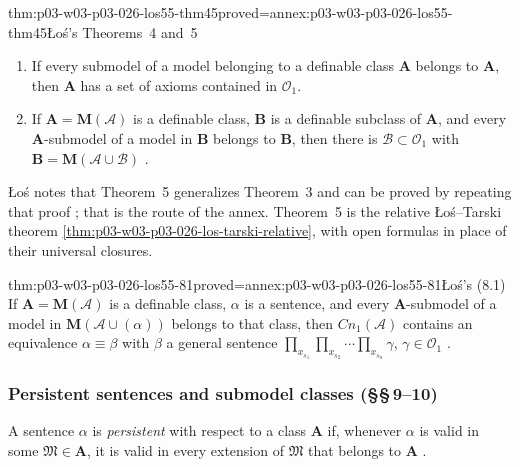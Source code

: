 \begin{hbtheorem}{thm:p03-w03-p03-026-los55-thm45}{proved=annex:p03-w03-p03-026-los55-thm45}{\L o\'s's Theorems~4 and~5}
\begin{enumerate}
 \item[(Theorem~4)] If every submodel of a model belonging to a definable
       class \(\mathbf A\) belongs to \(\mathbf A\), then \(\mathbf A\) has a
       set of axioms contained in \(\mathcal O_1\).
 \item[(Theorem~5)] If \(\mathbf A=\mathbf M(\mathcal A)\) is a definable
       class, \(\mathbf B\) is a definable subclass of \(\mathbf A\), and
       every \(\mathbf A\)-submodel of a model in \(\mathbf B\) belongs to
       \(\mathbf B\), then there is \(\mathcal B\subset\mathcal O_1\) with
       \(\mathbf B=\mathbf M(\mathcal A\cup\mathcal B)\)
       \cite[p.~47]{Los1955}.
\end{enumerate}
\end{hbtheorem}

\L o\'s notes that Theorem~5 generalizes Theorem~3 and can be proved by
repeating that proof \cite[p.~47]{Los1955}; that is the route of the annex.
Theorem~5 is the relative \L o\'s--Tarski theorem
\cref{thm:p03-w03-p03-026-los-tarski-relative}, with open formulas in place
of their universal closures.

\begin{hbcorollary}{thm:p03-w03-p03-026-los55-81}{proved=annex:p03-w03-p03-026-los55-81}{\L o\'s's (8.1)}
If \(\mathbf A=\mathbf M(\mathcal A)\) is a definable class, \(\alpha\) is a
sentence, and every \(\mathbf A\)-submodel of a model in
\(\mathbf M(\mathcal A\cup(\alpha))\) belongs to that class, then
\(\mathit{Cn}_1(\mathcal A)\) contains an equivalence \(\alpha\equiv\beta\)
with \(\beta\) a general sentence
\(\prod_{x_{s_1}}\prod_{x_{s_2}}\cdots\prod_{x_{s_n}}\gamma\),
\(\gamma\in\mathcal O_1\) \cite[p.~48]{Los1955}.
\end{hbcorollary}

\subsubsection{Persistent sentences and submodel classes (\S\S\,9--10)}

A sentence \(\alpha\) is \emph{persistent} with respect to a class
\(\mathbf A\) if, whenever \(\alpha\) is valid in some
\(\mathfrak M\in\mathbf A\), it is valid in every extension of
\(\mathfrak M\) that belongs to \(\mathbf A\) \cite[p.~48]{Los1955}.

